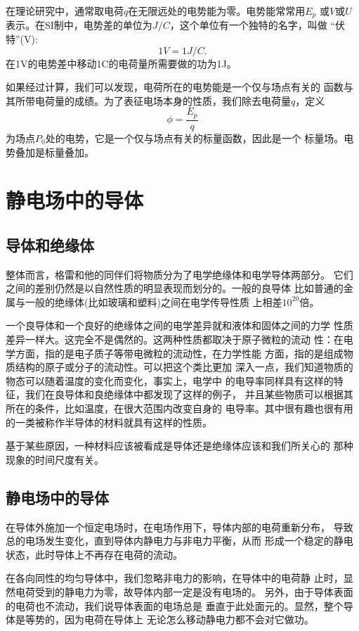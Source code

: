 在理论研究中，通常取电荷$ q $在无限远处的电势能为零。电势能常常用$E_p$
或$V$或$U$表示。在SI制中，电势差的单位为$J/C$，这个单位有一个独特的名字，叫做 
“伏特”(V):
\begin{equation}
    1V=1J/C.
\end{equation}
在1V的电势差中移动1C的电荷量所需要做的功为1J。

如果经过计算，我们可以发现，电荷所在的电势能是一个仅与场点有关的
函数与其所带电荷量的成绩。为了表征电场本身的性质，我们除去电荷量$q$，定义 
\begin{equation}
    \phi=\frac{E_p}{q}
\end{equation}
为场点$P_0$处的电势，它是一个仅与场点有关的标量函数，因此是一个
标量场。电势叠加是标量叠加。

\section{静电场中的导体}
\subsection{导体和绝缘体}
整体而言，格雷和他的同伴们将物质分为了电学绝缘体和电学导体两部分。
它们之间的差别仍然是以自然性质的明显表现而划分的。一般的良导体
比如普通的金属与一般的绝缘体(比如玻璃和塑料)之间在电学传导性质
上相差$10^{20}$倍。

一个良导体和一个良好的绝缘体之间的电学差异就和液体和固体之间的力学
性质差异一样大。这完全不是偶然的。这两种性质都取决于原子微粒的流动
性：在电学方面，指的是电子质子等带电微粒的流动性，在力学性能
方面，指的是组成物质结构的原子或分子的流动性。可以把这个类比更加
深入一点，我们知道物质的物态可以随着温度的变化而变化，事实上，电学中
的电导率同样具有这样的特征，我们在良导体和良绝缘体中都发现了这样的例子，
并且某些物质可以根据其所在的条件，比如温度，在很大范围内改变自身的
电导率。其中很有趣也很有用的一类被称作半导体的材料就具有这样的性质。

基于某些原因，一种材料应该被看成是导体还是绝缘体应该和我们所关心的
那种现象的时间尺度有关。
\subsection{静电场中的导体}
在导体外施加一个恒定电场时，在电场作用下，导体内部的电荷重新分布，
导致总的电场发生变化，直到导体内静电力与非电力平衡，从而
形成一个稳定的静电状态，此时导体上不再存在电荷的流动。

在各向同性的均匀导体中，我们忽略非电力的影响，在导体中的电荷静
止时，显然电荷受到的静电力为零，故导体内部一定是没有电场的。
另外，由于导体表面的电荷也不流动，我们说导体表面的电场总是
垂直于此处面元的。显然，整个导体是等势的，因为电荷在导体上
无论怎么移动静电力都不会对它做功。

